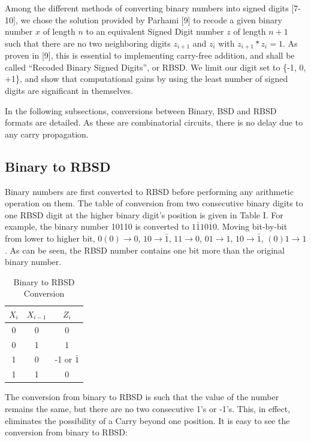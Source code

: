 \documentclass[conference]{IEEEtran_IBSS}
\begin{document}
Among the different methods of converting binary numbers into signed digits [7-10], we chose  the solution provided by Parhami [9] to recode a given binary number $x$ of length $n$ to an equivalent Signed Digit number $z$ of length $n+1$ such that there are no two neighboring digits $z_{i+1}$ and $z_{i}$ with $z_{i+1} * z_{i} = 1$. As proven in [9], this is essential to implementing carry-free addition, and shall be called ``Recoded Binary Signed Digits'', or RBSD. We limit our digit set to \{-1, 0, +1\}, and show that computational gains by using the least number of signed digits are significant in themselves.

In the following subsections, conversions between Binary, BSD and RBSD formats are detailed. As these are combinatorial circuits, there is no delay due to any carry propagation.

\subsection{Binary to RBSD}

Binary numbers are first converted to RBSD before performing any arithmetic operation on them. The table of conversion from two consecutive binary digits to one RBSD digit at the higher binary digit’s position is given in Table I. For example, the binary number 10110 is converted to $1\bar{1}10\bar{1}0$. Moving bit-by-bit from lower to higher bit, $0(0) \to 0$, $10 \to \bar{1}$, $11 \to 0$, $01 \to 1$, $10 \to \bar{1}$, $(0)1 \to 1$. As can be seen, the RBSD number contains one bit more than the original binary number.

\vspace{-.5em}
\begin{table}[h!]
  \centering
  \caption{Binary to RBSD Conversion}
  \label{tab:table1}
  \begin{tabular}{|c|c||c|}
    \hline
    $X_{i}$ & $X_{i-1}$ & $Z_{i}$ \\
    \hline
    \hline
    0 & 0 & 0\\
    \hline
    0 & 1 & 1\\
    \hline
    1 & 0 & -1 or $\bar{1}$\\
    \hline
    1 & 1 & 0\\
    \hline
  \end{tabular}
\end{table}

The conversion from binary to RBSD is such that the value of the number remains the same, but there are no two consecutive 1’s or -1’s. This, in effect, eliminates the possibility of a Carry beyond one position. It is easy to see the conversion from binary to RBSD:
\end{document}
